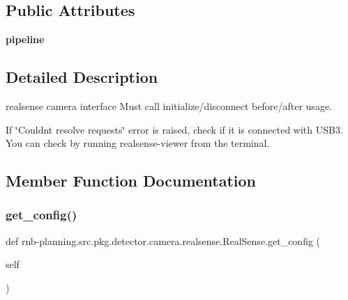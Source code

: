 \subsection*{Public Attributes}
\begin{DoxyCompactItemize}
\item 
\mbox{\label{classrnb-planning_1_1src_1_1pkg_1_1detector_1_1camera_1_1realsense_1_1_real_sense_a56540be2a9f7b73b4a7fc5454b15d830}} 
{\bfseries pipeline}
\end{DoxyCompactItemize}


\subsection{Detailed Description}
realsense camera interface Must call initialize/disconnect before/after usage. 

If \char`\"{}\+Couldn\textquotesingle{}t resolve requests\char`\"{} error is raised, check if it is connected with U\+S\+B3. You can check by running realsense-\/viewer from the terminal. 

\subsection{Member Function Documentation}
\mbox{\label{classrnb-planning_1_1src_1_1pkg_1_1detector_1_1camera_1_1realsense_1_1_real_sense_a41db65fddfacd32de74880491c42a98f}} 
\subsubsection{\texorpdfstring{get\+\_\+config()}{get\_config()}}
{\footnotesize\ttfamily def rnb-\/planning.\+src.\+pkg.\+detector.\+camera.\+realsense.\+Real\+Sense.\+get\+\_\+config (\begin{DoxyParamCaption}\item[{}]{self }\end{DoxyParamCaption})}



